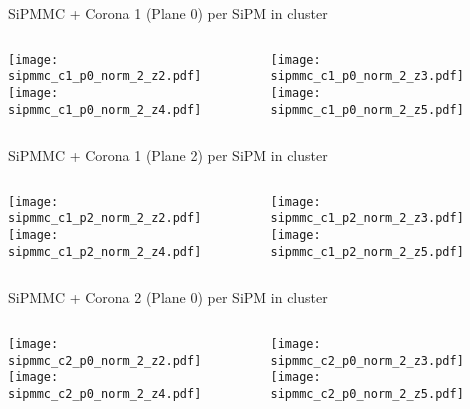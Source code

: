 \documentclass{beamer}
\begin{document}
\begin{frame}{SiPMMC + Corona 1 (Plane 0) per SiPM in cluster}
	\begin{columns}[onlytextwidth]
		\begin{column}{0.5\textwidth}
			\texttt{[image: sipmmc\_c1\_p0\_norm\_2\_z2.pdf]} \\
			\texttt{[image: sipmmc\_c1\_p0\_norm\_2\_z4.pdf]}
		 \end{column}
		 \begin{column}{0.5\textwidth}
			\texttt{[image: sipmmc\_c1\_p0\_norm\_2\_z3.pdf]} \\
			\texttt{[image: sipmmc\_c1\_p0\_norm\_2\_z5.pdf]}
		 \end{column}
 \end{columns}
\end{frame}

\begin{frame}{SiPMMC + Corona 1 (Plane 2) per SiPM in cluster}
	\begin{columns}[onlytextwidth]
		\begin{column}{0.5\textwidth}
			\texttt{[image: sipmmc\_c1\_p2\_norm\_2\_z2.pdf]} \\
			\texttt{[image: sipmmc\_c1\_p2\_norm\_2\_z4.pdf]}
		 \end{column}
		 \begin{column}{0.5\textwidth}
			\texttt{[image: sipmmc\_c1\_p2\_norm\_2\_z3.pdf]} \\
			\texttt{[image: sipmmc\_c1\_p2\_norm\_2\_z5.pdf]}
		 \end{column}
 \end{columns}
\end{frame}


\begin{frame}{SiPMMC + Corona 2 (Plane 0) per SiPM in cluster}
	\begin{columns}[onlytextwidth]
		\begin{column}{0.5\textwidth}
			\texttt{[image: sipmmc\_c2\_p0\_norm\_2\_z2.pdf]} \\
			\texttt{[image: sipmmc\_c2\_p0\_norm\_2\_z4.pdf]}
		 \end{column}
		 \begin{column}{0.5\textwidth}
			\texttt{[image: sipmmc\_c2\_p0\_norm\_2\_z3.pdf]} \\
			\texttt{[image: sipmmc\_c2\_p0\_norm\_2\_z5.pdf]}
		 \end{column}
 \end{columns}
\end{frame}
\end{document}
